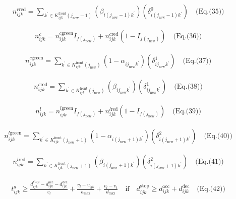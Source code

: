 \documentclass[10pt]{article}
\begin{document}
\[\begin{aligned}&\quad n^{r \text{red}}_{ijk} = \sum_{k^{\prime} \in K^{\text{front}}_{ijk}(j_{\text{new}}-1)} (\beta_{i(j_{\text{new}}-1)k^{\prime}})(\delta^{0}_{i(j_{\text{new}}-1)k^{\prime}}) \quad \text{(Eq.(35))}\end{aligned}\]

\[\begin{aligned}&\quad n^{c}_{ijk} = n^{c \text{green}}_{ijk} I_{f(j_{\text{new}})} + n^{c \text{red}}_{ijk} (1 - I_{f(j_{\text{new}})}) \quad \text{(Eq.(36))}\end{aligned}\]

\[\begin{aligned}&\quad n^{c \text{green}}_{ijk} = \sum_{k^{\prime} \in K^{\text{front}}_{ijk}(j_{\text{new}})} (1 - \alpha_{ij_{\text{new}}k^{\prime}})(\delta^{1}_{ij_{\text{new}}k^{\prime}}) \quad \text{(Eq.(37))}\end{aligned}\]

\[\begin{aligned}&\quad n^{c \text{red}}_{ijk} = \sum_{k^{\prime} \in K^{\text{front}}_{ijk}(j_{\text{new}})} (\beta_{ij_{\text{new}}k^{\prime}})(\delta^{1}_{ij_{\text{new}}k^{\prime}}) \quad \text{(Eq.(38))}\end{aligned}\]

\[\begin{aligned}&\quad n^{l}_{ijk} = n^{l \text{green}}_{ijk} I_{f(j_{\text{new}})} + n^{l \text{red}}_{ijk} (1 - I_{f(j_{\text{new}})}) \quad \text{(Eq.(39))}\end{aligned}\]

\[\begin{aligned}&\quad n^{l \text{green}}_{ijk} = \sum_{k^{\prime} \in K^{\text{front}}_{ijk}(j_{\text{new}}+1)} (1 - \alpha_{i(j_{\text{new}}+1)k^{\prime}})(\delta^{2}_{i(j_{\text{new}}+1)k^{\prime}}) \quad \text{(Eq.(40))}\end{aligned}\]

\[\begin{aligned}&\quad n^{l \text{red}}_{ijk} = \sum_{k^{\prime} \in K^{\text{front}}_{ijk}(j_{\text{new}}+1)} (\beta_{i(j_{\text{new}}+1)k^{\prime}})(\delta^{2}_{i(j_{\text{new}}+1)k^{\prime}}) \quad \text{(Eq.(41))}\end{aligned}\]

\[\begin{aligned}&\quad t^{a}_{ijk} \geq \frac{d^{\text{stop}}_{ijk} - d^{\text{acc}}_{ijk} - d^{\text{dec}}_{ijk}}{v_{l}} + \frac{v_{l} - v_{ijk}}{a_{\max}} + \frac{v_{l} - v_{t}}{d_{\max}} \quad \text{if} \quad d^{\text{stop}}_{ijk} \geq d^{\text{acc}}_{ijk} + d^{\text{dec}}_{ijk} \quad \text{(Eq.(42))}\end{aligned}\]
\end{document}
